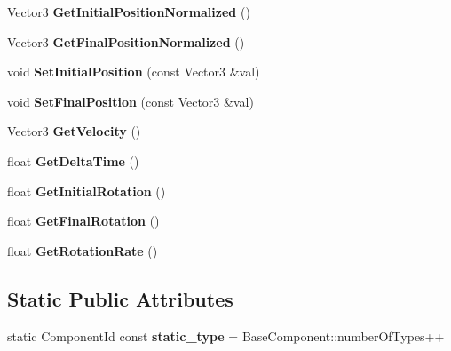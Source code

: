 \begin{DoxyCompactItemize}
\mbox{\label{classUIComponent_ad0850c699c44fda860915e1f35903fc6}} 
Vector3 {\bfseries Get\+Initial\+Position\+Normalized} ()
\item 
\mbox{\label{classUIComponent_a3539578ff8b52b827552d9701fa0a9c0}} 
Vector3 {\bfseries Get\+Final\+Position\+Normalized} ()
\item 
\mbox{\label{classUIComponent_a29a2e1cd9cc4ea8eb889152a962a9147}} 
void {\bfseries Set\+Initial\+Position} (const Vector3 \&val)
\item 
\mbox{\label{classUIComponent_a420d395a7e6f7cf6e8d06d5462c35318}} 
void {\bfseries Set\+Final\+Position} (const Vector3 \&val)
\item 
\mbox{\label{classUIComponent_a253ef99d479ddf08ab212852f1d00668}} 
Vector3 {\bfseries Get\+Velocity} ()
\item 
\mbox{\label{classUIComponent_a8c463e8fb54d3d6553373d5d275a1dc8}} 
float {\bfseries Get\+Delta\+Time} ()
\item 
\mbox{\label{classUIComponent_a3d3064b86d8204f75bd2b61ad45bb64c}} 
float {\bfseries Get\+Initial\+Rotation} ()
\item 
\mbox{\label{classUIComponent_a726eb48a423d5eced75e4c109051aea5}} 
float {\bfseries Get\+Final\+Rotation} ()
\item 
\mbox{\label{classUIComponent_aca6ee5c09157243fe13cecb665d4afa7}} 
float {\bfseries Get\+Rotation\+Rate} ()
\end{DoxyCompactItemize}
\subsection*{Static Public Attributes}
\begin{DoxyCompactItemize}
\item 
\mbox{\label{classUIComponent_a58909a9d1900904429ae4070bf1e2f0a}} 
static Component\+Id const {\bfseries static\+\_\+type} = Base\+Component\+::number\+Of\+Types++
\end{DoxyCompactItemize}

